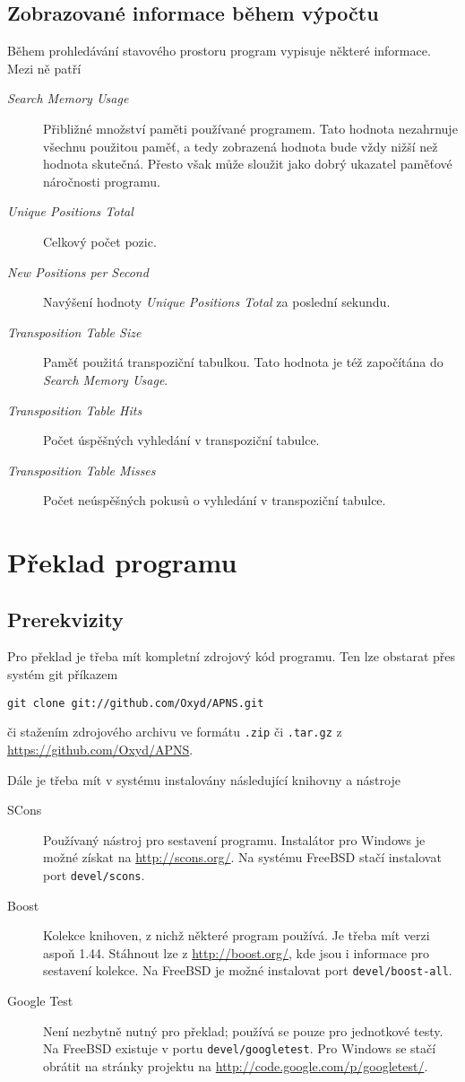 \documentclass{article}
\begin{document}
\subsection{Zobrazované informace během výpočtu}
Během prohledávání stavového prostoru program vypisuje některé informace. Mezi ně patří \begin{description}
\item[\emph{Search Memory Usage}] Přibližné množství paměti používané programem. Tato hodnota nezahrnuje všech\-nu
použitou paměť, a tedy zobrazená hodnota bude vždy nižší než hodnota skutečná. Přesto však může sloužit jako dobrý
ukazatel paměťové náročnosti programu.
\item[\emph{Unique Positions Total}] Celkový počet pozic.
\item[\emph{New Positions per Second}] Navýšení hodnoty \emph{Unique Positions Total} za poslední sekundu.
\item[\emph{Transposition Table Size}] Paměť použitá transpoziční tabulkou. Tato hodnota je též započítána do
\emph{Search Memory Usage}.
\item[\emph{Transposition Table Hits}] Počet úspěšných vyhledání v transpoziční tabulce.
\item[\emph{Transposition Table Misses}] Počet neúspěšných pokusů o vyhledání v transpoziční tabulce.
\end{description}

\section{Překlad programu}
\label{sec:compiling}

\subsection{Prerekvizity}
Pro překlad je třeba mít kompletní zdrojový kód programu. Ten lze obstarat přes systém git příkazem
\begin{center}\verb+git clone git://github.com/Oxyd/APNS.git+\end{center} či stažením zdrojového archivu ve formátu
\texttt{.zip} či \texttt{.tar.gz} z \url{https://github.com/Oxyd/APNS}.

Dále je třeba mít v systému instalovány následující knihovny a nástroje\begin{description}
\item[SCons] Používaný nástroj pro sestavení programu. Instalátor pro Windows je možné získat na
\url{http://scons.org/}. Na systému FreeBSD stačí instalovat port \texttt{devel/scons}.
\item[Boost] Kolekce knihoven, z nichž některé program používá. Je třeba mít verzi aspoň 1.44. Stáhnout lze z
\url{http://boost.org/}, kde jsou i informace pro sestavení kolekce. Na FreeBSD je možné instalovat port
\texttt{devel/boost-all}.
\item[Google Test] Není nezbytně nutný pro překlad; používá se pouze pro jednotkové testy. Na FreeBSD existuje v portu
\texttt{devel/googletest}. Pro Windows se stačí obrátit na stránky projektu na
\url{http://code.google.com/p/googletest/}.
\end{description}
\end{document}
